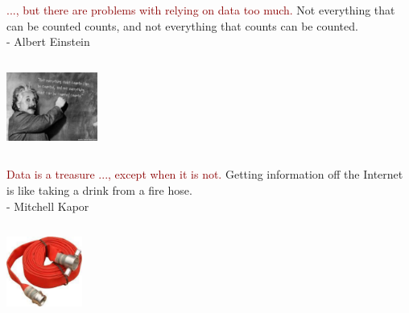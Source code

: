 \documentclass{beamer}
\begin{document}
\begin{frame}
\begin{columns}
\column{28em}
\vspace{2cm}
\begin{block}{\centering\textcolor{darkred}{..., but there are problems with relying on data too much.}}
\justifying
Not everything that can be counted counts, and not everything that counts can be counted.\\
\vspace{.2cm}
\hspace*{8.5cm}\footnotesize{- Albert Einstein}
\end{block}
\end{columns}
\vspace{.75cm}
\hspace*{8.5cm}\includegraphics[width=3cm]{figs/einstein.pdf}
\end{frame}

\begin{frame}
\begin{columns}
\column{25em}
\vspace{2cm}
\begin{block}{\centering\textcolor{darkred}{Data is a treasure ..., except when it is not.}}
\justifying
Getting information off the Internet is like taking a drink from a fire hose.\\
\vspace{.2cm}
\hspace*{7.2cm}\footnotesize{- Mitchell Kapor}
\end{block}
\end{columns}
\vspace{.75cm}
\hspace*{9cm}\includegraphics[width=2.5cm]{figs/firehose.pdf}
\end{frame}
\end{document}
